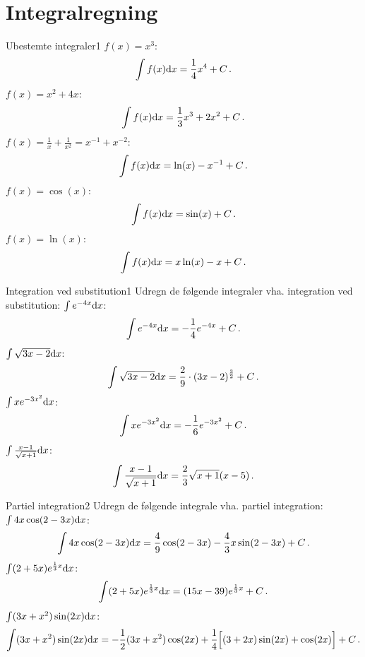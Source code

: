 \section*{Integralregning}
\begin{opgave}{Ubestemte integraler}{1}
	\opg $f(x) = x^3$: 
	\begin{equation*}
	\int f(x) \mathrm{d} x = \frac{1}{4}x^4 +C \, .
	\end{equation*}
	\opg $f(x) = x^2 + 4x$:
	\begin{equation*}
	\int f(x) \mathrm{d} x = \frac{1}{3}x^3 + 2x^2 + C \, .
	\end{equation*}
	\opg $f(x) = \frac{1}{x} + \frac{1}{x^2}=x^{-1}+x^{-2}$: 
	\begin{equation*}
	\int f(x) \mathrm{d} x = \ln (x) -x^{-1} + C \, .
	\end{equation*}
	\opg $f(x) = \cos (x)$: 
	\begin{equation*}
	\int f(x) \mathrm{d} x = \sin(x)+C \, .
	\end{equation*}
	\opg $f(x) = \ln (x)$: 
	\begin{equation*}
	\int f(x) \mathrm{d} x = x\ln (x) -x + C \, .
	\end{equation*}
\end{opgave}
\begin{opgave}{Integration ved substitution}{1}
	Udregn de følgende integraler vha. integration ved substitution:
	\opg $\int e^{-4x} \mathrm{d} x$:
	\begin{align*}
	\int e^{-4x} \mathrm{d} x = -\frac{1}{4}e^{-4x} + C \, .
	\end{align*}
	\opg $\int \sqrt{3x-2} \mathrm{d} x$:
	\begin{align*}
	\int \sqrt{3x-2} \mathrm{d} x = \frac{2}{9}\cdot(3x-2)^{\frac{3}{2}} + C \, .
	\end{align*}
	\opg $\int xe^{-3x^2} \mathrm{d} x$:
	\begin{align*}
	\int xe^{-3x^2} \mathrm{d} x = -\frac{1}{6}e^{-3x^2}+C \, .
	\end{align*}
	\opg $\int \frac{x-1}{\sqrt{x+1}} \mathrm{d} x$:
	\begin{align*}
	\int \frac{x-1}{\sqrt{x+1}} \mathrm{d} x = \frac{2}{3}\sqrt{x+1}(x-5) \, .
	\end{align*}
\end{opgave}
\begin{opgave}{Partiel integration}{2}
	Udregn de følgende integrale vha. partiel integration:
	\opg $\int 4x\cos(2-3x)\mathrm{d} x$:
	\begin{align*}
	\int 4x\cos(2-3x)\mathrm{d} x = \frac{4}{9}\cos(2-3x)-\frac{4}{3}x\sin(2-3x) +C \, .
	\end{align*}
	\opg $\int (2+5x)e^{\frac{1}{3}x}\mathrm{d} x$:
	\begin{align*}
	\int (2+5x)e^{\frac{1}{3}x}\mathrm{d} x = (15x-39)e^{\frac{1}{3}x}+C \, .
	\end{align*}
	\opg $\int (3x+x^2)\sin (2x) \mathrm{d} x$:
	\begin{align*}
	\int (3x+x^2)\sin (2x) \mathrm{d} x = -\frac{1}{2}(3x+x^2)\cos (2x) +\frac{1}{4}\Big[ (3+2x)\sin (2x) + \cos (2x) \Big] + C \, .
	\end{align*}
\end{opgave}

